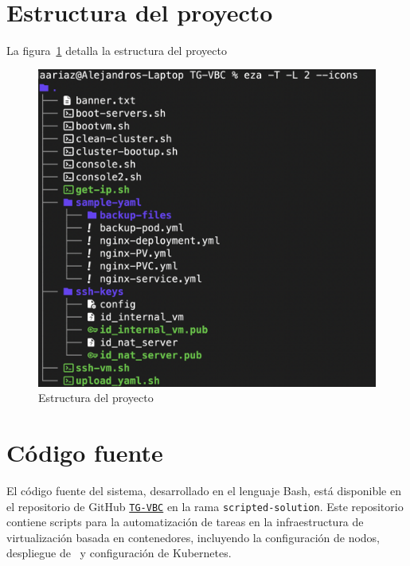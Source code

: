 \label{cap:pmv}
\mbox{}\\
\section{Estructura del proyecto}
\noindent
La figura~\ref{fig:estructura-proyecto} detalla la estructura del proyecto
\begin{figure}[H]
    \centering
    \includegraphics[scale=0.2]{tablas-images/cp6/src/tree.png}
    \caption{Estructura del proyecto}\label{fig:estructura-proyecto}
\end{figure}

\section{Código fuente}\label{sec:automatizacion-scripts}
\noindent
El código fuente del sistema, desarrollado en el lenguaje Bash, está disponible en el repositorio de GitHub \href{https://github.com/AariazP/TG-VBC.git}{\texttt{TG-VBC}} en la rama \texttt{scripted-solution}. Este repositorio contiene scripts para la automatización de tareas en la infraestructura de virtualización basada en contenedores, incluyendo la configuración de nodos, despliegue de \VM\ y configuración de Kubernetes. 

